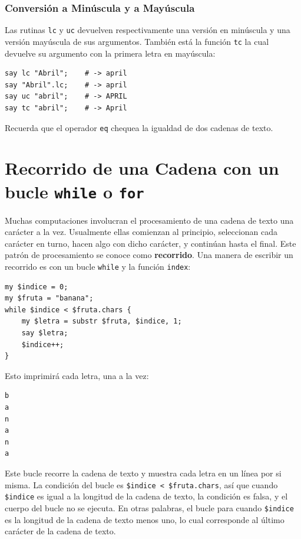 \subsubsection{Conversión a Minúscula y a Mayúscula}

Las rutinas {\tt lc} y {\tt uc} devuelven respectivamente
una versión en minúscula y una versión mayúscula de sus 
argumentos. También está la función {\tt tc} la cual devuelve
su argumento con la primera letra en mayúscula:

\begin{verbatim}
say lc "Abril";    # -> april
say "Abril".lc;    # -> april
say uc "abril";    # -> APRIL
say tc "abril";    # -> April
\end{verbatim}

Recuerda que el operador {\tt eq} chequea la igualdad de dos 
cadenas de texto.

\section{Recorrido de una Cadena con un bucle {\tt while} o {\tt for}}
\label{stringtraversal}

Muchas computaciones involucran el procesamiento de una
cadena de texto una carácter a la vez. Usualmente ellas
comienzan al principio, seleccionan cada carácter en turno,
hacen algo con dicho carácter, y continúan hasta el final.
Este patrón de procesamiento se conoce como {\bf recorrido}. 
Una manera de escribir un recorrido es con un bucle {\tt while}
y la función {\tt index}:

\begin{verbatim}
my $indice = 0;
my $fruta = "banana";
while $indice < $fruta.chars { 
    my $letra = substr $fruta, $indice, 1; 
    say $letra; 
    $indice++;
}
\end{verbatim}
%

Esto imprimirá cada letra, una a la vez:
\begin{verbatim}
b
a
n
a
n
a
\end{verbatim}
%
Este bucle recorre la cadena de texto y muestra cada letra
en un línea por si misma. La condición del bucle es 
{\tt \$indice < \$fruta.chars},
así que cuando {\tt \$indice} es igual a la longitud de
la cadena de texto, la condición es falsa, y el cuerpo del
bucle no se ejecuta. En otras palabras, el bucle para cuando
{\tt \$indice} es la longitud de la cadena de texto menos 
uno, lo cual corresponde al último carácter de la cadena 
de texto.

